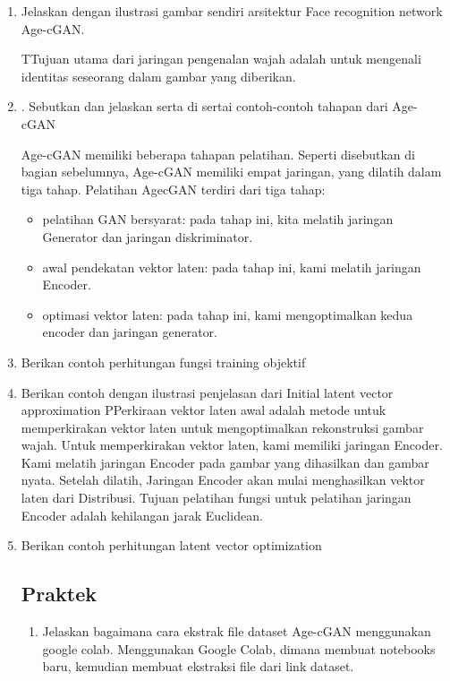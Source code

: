 \begin{enumerate}
	\item Jelaskan dengan ilustrasi gambar sendiri arsitektur Face recognition network Age-cGAN.

	\hfill \break
	TTujuan utama dari jaringan pengenalan wajah adalah untuk mengenali identitas seseorang dalam gambar yang diberikan.
	
	\item . Sebutkan dan jelaskan serta di sertai contoh-contoh tahapan dari Age-cGAN

	\hfill \break
	Age-cGAN memiliki beberapa tahapan pelatihan. Seperti disebutkan di bagian sebelumnya, Age-cGAN memiliki empat jaringan, yang dilatih dalam tiga tahap. Pelatihan AgecGAN terdiri dari tiga tahap:

	\begin{itemize} 
			\item pelatihan GAN bersyarat: pada tahap ini, kita melatih jaringan Generator dan jaringan diskriminator.
    		\item awal pendekatan vektor laten: pada tahap ini, kami melatih jaringan Encoder.
    		\item optimasi vektor laten: pada tahap ini, kami mengoptimalkan kedua encoder dan jaringan generator.
		\end{itemize}
	\item Berikan contoh perhitungan fungsi training objektif
	\hfill \break
	


	\item Berikan contoh dengan ilustrasi penjelasan dari Initial latent vector approximation
	\hfill \break
	PPerkiraan vektor laten awal adalah metode untuk memperkirakan vektor laten untuk mengoptimalkan rekonstruksi gambar wajah. Untuk memperkirakan vektor laten, kami memiliki jaringan Encoder. Kami melatih jaringan Encoder pada gambar yang dihasilkan dan gambar nyata. Setelah dilatih, Jaringan Encoder akan mulai menghasilkan vektor laten dari Distribusi. Tujuan pelatihan fungsi untuk pelatihan jaringan Encoder adalah kehilangan jarak Euclidean.
	
	\item Berikan contoh perhitungan latent vector optimization
	
\subsection{Praktek}
\begin{enumerate}
\item Jelaskan bagaimana cara ekstrak ﬁle dataset Age-cGAN menggunakan google colab.
Menggunakan Google Colab, dimana membuat notebooks baru, kemudian membuat ekstraksi file dari link dataset.





\end{enumerate}
\end{enumerate}
